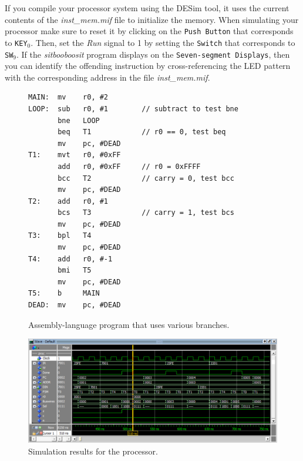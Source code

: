 \documentclass[epsfig,10pt,fullpage]{article} \addtolength{\textwidth}{1.5in}
\newcommand{\red}[1]{{\color{red}\sf{#1}}}
\begin{document}
\begin{enumerate}
If you compile your processor system using the DESim tool, it uses the current 
contents of the {\it inst\_mem.mif} file to initialize the memory. When simulating your 
processor make sure to reset it by clicking on the \texttt{Push Button} that corresponds to
\texttt{KEY}$_0$. Then, set the {\it Run} signal to 1 by setting the \texttt{Switch}
that corresponds to \texttt{SW}$_9$. If the {\it sitbooboosit} program displays
\texttt{\red{FAILEd}} on the
\texttt{Seven-segment Displays}, then you can identify the
offending instruction by cross-referencing the LED pattern with the corresponding address
in the file {\it inst\_mem.mif}.

\lstset{language=ASM,numbers=none,escapechar=|}
\begin{figure}[H]
\begin{center}
\begin{minipage}[h]{13.5 cm}
\begin{lstlisting}[name=proc]
MAIN:  mv    r0, #2
LOOP:  sub   r0, #1        // subtract to test bne
       bne   LOOP
       beq   T1            // r0 == 0, test beq
       mv    pc, #DEAD
T1:    mvt   r0, #0xFF
       add   r0, #0xFF     // r0 = 0xFFFF
       bcc   T2            // carry = 0, test bcc
       mv    pc, #DEAD
T2:    add   r0, #1
       bcs   T3            // carry = 1, test bcs
       mv    pc, #DEAD
T3:    bpl   T4
       mv    pc, #DEAD
T4:    add   r0, #-1
       bmi   T5
       mv    pc, #DEAD
T5:    b     MAIN
DEAD:  mv    pc, #DEAD
\end{lstlisting}
\end{minipage}
\caption{Assembly-language program that uses various branches.}
\label{fig:branches}
\end{center}
\end{figure}

\begin{figure}[H]
	\begin{center}
		\includegraphics[width=\textwidth]{figures/part5.png}
	\end{center}
	\caption{Simulation results for the processor.}
	\label{fig:part5}
\end{figure}


\end{enumerate}
\end{document}
